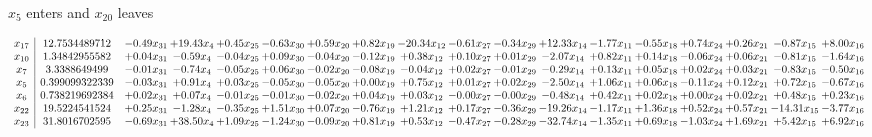\documentclass[9pt]{article}
\begin{document}
 $ x_{5} $ enters and $ x_{20} $ leaves 

 \[\begin{array}{c| c c@{\hskip 2pt} c@{\hskip 2pt} c@{\hskip 2pt} c@{\hskip 2pt} c@{\hskip 2pt} c@{\hskip 2pt} c@{\hskip 2pt} c@{\hskip 2pt} c@{\hskip 2pt} c@{\hskip 2pt} c@{\hskip 2pt} c@{\hskip 2pt} c@{\hskip 2pt} c@{\hskip 2pt} c@{\hskip 2pt} c@{\hskip 2pt} }
 x_{17}   &  12.7534489712 & -0.49 x_{31} & + 19.43 x_{4} & +  0.45 x_{25} & -0.63 x_{30} & +  0.59 x_{20} & +  0.82 x_{19} & -20.34 x_{12} & -0.61 x_{27} & -0.34 x_{29} & + 12.33 x_{14} & -1.77 x_{11} & -0.55 x_{18} & +  0.74 x_{24} & +  0.26 x_{21} & -0.87 x_{15} & +  8.00 x_{16}\\
 x_{10}   &  1.34842955582 & +  0.04 x_{31} & -0.59 x_{4} & -0.04 x_{25} & +  0.09 x_{30} & -0.04 x_{20} & -0.12 x_{19} & +  0.38 x_{12} & +  0.10 x_{27} & +  0.01 x_{29} & -2.07 x_{14} & +  0.82 x_{11} & +  0.14 x_{18} & -0.06 x_{24} & +  0.06 x_{21} & -0.81 x_{15} & -1.64 x_{16}\\
 x_{7}   &  3.3388649499 & -0.01 x_{31} & -0.74 x_{4} & -0.05 x_{25} & +  0.06 x_{30} & -0.02 x_{20} & -0.08 x_{19} & -0.04 x_{12} & +  0.02 x_{27} & -0.01 x_{29} & -0.29 x_{14} & +  0.13 x_{11} & +  0.05 x_{18} & +  0.02 x_{24} & +  0.03 x_{21} & -0.83 x_{15} & -0.50 x_{16}\\
 x_{5}   &  0.399099322339 & -0.03 x_{31} & +  0.91 x_{4} & +  0.03 x_{25} & -0.05 x_{30} & -0.05 x_{20} & +  0.00 x_{19} & +  0.75 x_{12} & +  0.01 x_{27} & +  0.02 x_{29} & -2.50 x_{14} & +  1.06 x_{11} & +  0.06 x_{18} & -0.11 x_{24} & +  0.12 x_{21} & +  0.72 x_{15} & -0.67 x_{16}\\
 x_{6}   &  0.738219692384 & +  0.02 x_{31} & +  0.07 x_{4} & -0.01 x_{25} & -0.01 x_{30} & -0.02 x_{20} & +  0.04 x_{19} & +  0.03 x_{12} & -0.00 x_{27} & -0.00 x_{29} & -0.48 x_{14} & +  0.42 x_{11} & +  0.02 x_{18} & +  0.00 x_{24} & +  0.02 x_{21} & +  0.48 x_{15} & +  0.23 x_{16}\\
 x_{22}   &  19.5224541524 & +  0.25 x_{31} & -1.28 x_{4} & -0.35 x_{25} & +  1.51 x_{30} & +  0.07 x_{20} & -0.76 x_{19} & +  1.21 x_{12} & +  0.17 x_{27} & -0.36 x_{29} & -19.26 x_{14} & -1.17 x_{11} & +  1.36 x_{18} & +  0.52 x_{24} & +  0.57 x_{21} & -14.31 x_{15} & -3.77 x_{16}\\
 x_{23}   &  31.8016702595 & -0.69 x_{31} & + 38.50 x_{4} & +  1.09 x_{25} & -1.24 x_{30} & -0.09 x_{20} & +  0.81 x_{19} & +  0.53 x_{12} & -0.47 x_{27} & -0.28 x_{29} & -32.74 x_{14} & -1.35 x_{11} & +  0.69 x_{18} & -1.03 x_{24} & +  1.69 x_{21} & +  5.42 x_{15} & +  6.92 x_{16}\\

\end{array}\]
\end{document}
